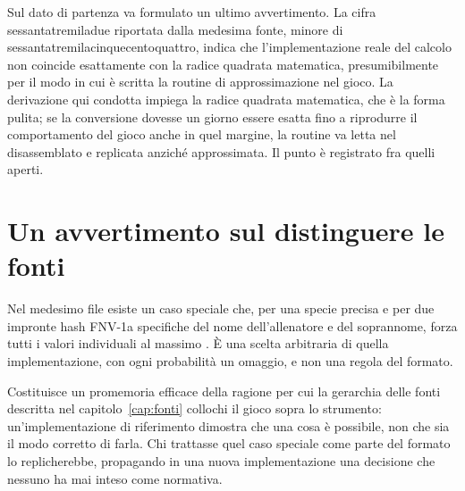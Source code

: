 Sul dato di partenza va formulato un ultimo avvertimento. La cifra sessantatremiladue riportata dalla medesima fonte, minore di sessantatremilacinquecentoquattro, indica che l'implementazione reale del calcolo non coincide esattamente con la radice quadrata matematica, presumibilmente per il modo in cui è scritta la routine di approssimazione nel gioco. La derivazione qui condotta impiega la radice quadrata matematica, che è la forma pulita; se la conversione dovesse un giorno essere esatta fino a riprodurre il comportamento del gioco anche in quel margine, la routine va letta nel disassemblato e replicata anziché approssimata. Il punto è registrato fra quelli aperti.

\section{Un avvertimento sul distinguere le fonti}

Nel medesimo file esiste un caso speciale che, per una specie precisa e per due impronte hash FNV-1a specifiche del nome dell'allenatore e del soprannome, forza tutti i valori individuali al massimo \cite{pccs}. È una scelta arbitraria di quella implementazione, con ogni probabilità un omaggio, e non una regola del formato.

Costituisce un promemoria efficace della ragione per cui la gerarchia delle fonti descritta nel capitolo~\ref{cap:fonti} collochi il gioco sopra lo strumento: un'implementazione di riferimento dimostra che una cosa è possibile, non che sia il modo corretto di farla. Chi trattasse quel caso speciale come parte del formato lo replicherebbe, propagando in una nuova implementazione una decisione che nessuno ha mai inteso come normativa.
